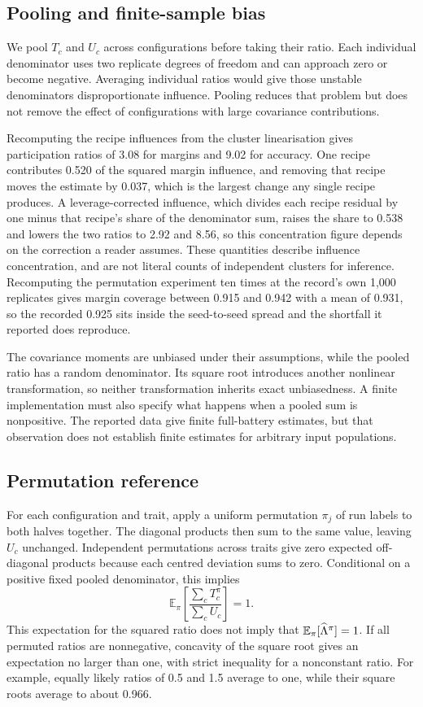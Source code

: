 \subsection{Pooling and finite-sample bias}
We pool $T_c$ and $U_c$ across configurations before taking their ratio. Each individual denominator uses two replicate degrees of freedom and can approach zero or become negative. Averaging individual ratios would give those unstable denominators disproportionate influence. Pooling reduces that problem but does not remove the effect of configurations with large covariance contributions.

Recomputing the recipe influences from the cluster linearisation gives participation ratios of 3.08 for margins and 9.02 for accuracy. One recipe contributes 0.520 of the squared margin influence, and removing that recipe moves the estimate by 0.037, which is the largest change any single recipe produces. A leverage-corrected influence, which divides each recipe residual by one minus that recipe's share of the denominator sum, raises the share to 0.538 and lowers the two ratios to 2.92 and 8.56, so this concentration figure depends on the correction a reader assumes. These quantities describe influence concentration, and are not literal counts of independent clusters for inference. Recomputing the permutation experiment ten times at the record's own 1,000 replicates gives margin coverage between 0.915 and 0.942 with a mean of 0.931, so the recorded 0.925 sits inside the seed-to-seed spread and the shortfall it reported does reproduce.

The covariance moments are unbiased under their assumptions, while the pooled ratio has a random denominator. Its square root introduces another nonlinear transformation, so neither transformation inherits exact unbiasedness. A finite implementation must also specify what happens when a pooled sum is nonpositive. The reported data give finite full-battery estimates, but that observation does not establish finite estimates for arbitrary input populations.

\subsection{Permutation reference}
For each configuration and trait, apply a uniform permutation $\pi_j$ of run labels to both halves together. The diagonal products then sum to the same value, leaving $U_c$ unchanged. Independent permutations across traits give zero expected off-diagonal products because each centred deviation sums to zero. Conditional on a positive fixed pooled denominator, this implies
\begin{equation}
\mathbb E_\pi\left[\frac{\sum_cT_c^\pi}{\sum_cU_c}\right]=1.
\end{equation}
This expectation for the squared ratio does not imply that $\mathbb E_\pi[\widehat{\Lambda}^\pi]=1$. If all permuted ratios are nonnegative, concavity of the square root gives an expectation no larger than one, with strict inequality for a nonconstant ratio. For example, equally likely ratios of 0.5 and 1.5 average to one, while their square roots average to about 0.966.

